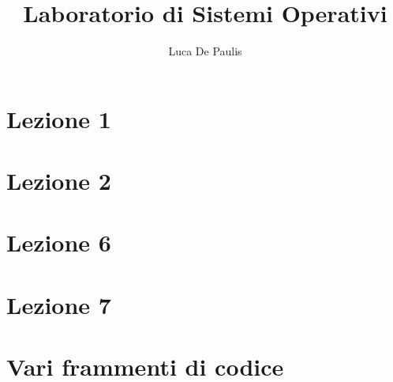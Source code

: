 \documentclass[
    oneside,
    10pt,
    language=italian,
    pagestyle=notes,
    fontstyle=palaeuler,
    thmstyle=boxed,
    colors
]{modernth}
\begin{document}

\author{Luca De Paulis}
\title{Laboratorio di Sistemi Operativi}
\maketitle

\frontmatter{}
\tableofcontents

\mainmatter{}

\chapter{Lezione 1}


\chapter{Lezione 2}





\chapter{Lezione 6}






\chapter{Lezione 7}








\appendix
\chapter{Vari frammenti di codice}

\end{document}
